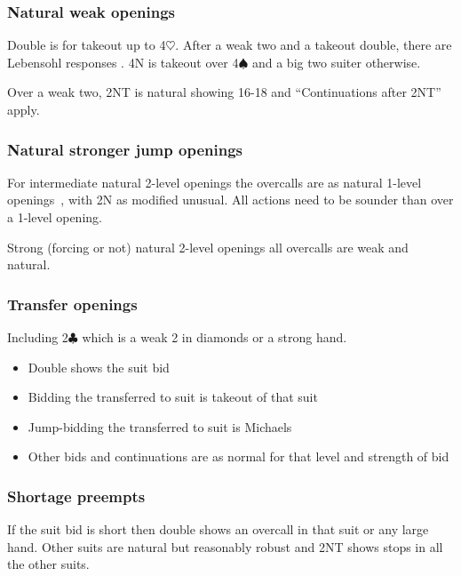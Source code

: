 \documentclass[a4paper,14pt]{extarticle}
\begin{document}
\subsubsection{Natural weak openings}
\label{sec:def:weak}

Double is for takeout up to 4$\heartsuit$. After a weak two and a takeout double, there
are Lebensohl responses . 4N is takeout over 4$\spadesuit$ and a big two suiter otherwise.

Over a weak two,  2NT is natural showing 16-18 and ``Continuations after 2NT'' 
apply.

\subsubsection{Natural stronger jump openings}
\label{sec:def:inter-strong}

For intermediate natural 2-level openings the overcalls are as natural 1-level
openings~, with 2N as modified unusual. All actions need to be
sounder than over a 1-level opening.

Strong (forcing or not) natural 2-level openings all overcalls are weak and natural.

\subsubsection{Transfer openings}
\label{sec:def:transfer}

Including 2$\clubsuit$ which is a weak 2 in diamonds or a strong hand.

\begin{itemize}
\item Double shows the suit bid
\item Bidding the transferred to suit is takeout of that suit
\item Jump-bidding the transferred to suit is Michaels
\item Other bids and continuations are as normal for that level and strength of bid
\end{itemize}

\subsubsection{Shortage preempts}

If the suit bid is short then double shows an overcall in that suit or any
large hand.  Other suits are natural but reasonably robust and 2NT shows stops
in all the other suits.
\end{document}
